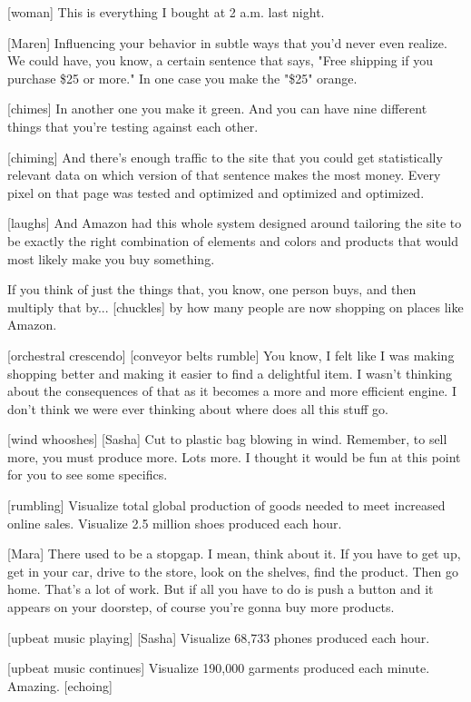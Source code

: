 \documentclass[a4paper]{article}
\begin{document}
	
	[woman] This is everything I bought at 2 a.m. last night.
	
	
	[Maren] Influencing your behavior in subtle ways that you'd never even realize. We could have, you know, a certain sentence that says, "Free shipping if you purchase \$25 or more." In one case you make the "\$25" orange.


	[chimes]
	In another one you make it green. And you can have nine different things that you're testing against each other.


	[chiming]
	And there's enough traffic to the site that you could get statistically relevant data on which version of that sentence makes the most money.
	Every pixel on that page was tested and optimized and optimized and optimized.
	
	
	[laughs] And Amazon had this whole system designed around tailoring the site to be exactly the right combination of elements and colors and products that would most likely make you buy something.
	
	
	
	If you think of just the things that, you know, one person buys, and then multiply that by... [chuckles] by how many people are now shopping on places like Amazon.
	
	
	[orchestral crescendo]
	[conveyor belts rumble]
	You know, I felt like I was making shopping better and making it easier to find a delightful item.
	I wasn't thinking about the consequences of that as it becomes a more and more efficient engine.
	I don't think we were ever thinking about where does all this stuff go.
	
	
	[wind whooshes]
	[Sasha] Cut to plastic bag blowing in wind.
	Remember, to sell more, you must produce more.
	Lots more.
	I thought it would be fun at this point for you to see some specifics.
	
	
	[rumbling]
	Visualize total global production of goods needed to meet increased online sales.
	Visualize 2.5 million shoes produced each hour.
	
	
	[Mara] There used to be a stopgap. I mean, think about it.
	If you have to get up, get in your car, drive to the store, look on the shelves, find the product.
	Then go home.
	That's a lot of work.
	But if all you have to do is push a button and it appears on your doorstep, of course you're gonna buy more products.
	
	[upbeat music playing]
	[Sasha] Visualize 68,733 phones produced each hour.
	
	
	[upbeat music continues]
	Visualize 190,000 garments produced each minute.
	Amazing. [echoing]
	
\end{document}
